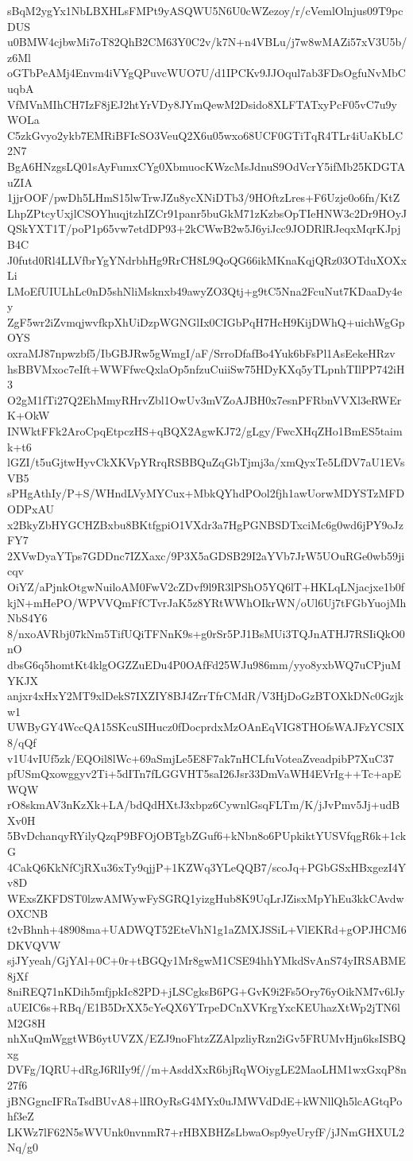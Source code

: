 sBqM2ygYx1NbLBXHLsFMPt9yASQWU5N6U0cWZezoy/r/cVemlOlnjus09T9pcDUS
u0BMW4cjbwMi7oT82QhB2CM63Y0C2v/k7N+n4VBLu/j7w8wMAZi57xV3U5b/z6Ml
oGTbPeAMj4Envm4iVYgQPuvcWUO7U/d1IPCKv9JJOqul7ab3FDsOgfuNvMbCuqbA
VfMVnMIhCH7IzF8jEJ2htYrVDy8JYmQewM2Dsido8XLFTATxyPcF05vC7u9yWOLa
C5zkGvyo2ykb7EMRiBFIcSO3VeuQ2X6u05wxo68UCF0GTiTqR4TLr4iUaKbLC2N7
BgA6HNzgsLQ01sAyFumxCYg0XbmuocKWzcMsJdnuS9OdVcrY5ifMb25KDGTAuZIA
1jjrOOF/pwDh5LHmS15lwTrwJZu8ycXNiDTb3/9HOftzLres+F6Uzje0o6fn/KtZ
LhpZPtcyUxjlCSOYhuqjtzhIZCr91panr5buGkM71zKzbsOpTIeHNW3c2Dr9HOyJ
QSkYXT1T/poP1p65vw7etdDP93+2kCWwB2w5J6yiJcc9JODRlRJeqxMqrKJpjB4C
J0futd0Rl4LLVfbrYgYNdrbhHg9RrCH8L9QoQG66ikMKnaKqjQRz03OTduXOXxLi
LMoEfUIULhLc0nD5shNliMsknxb49awyZO3Qtj+g9tC5Nna2FcuNut7KDaaDy4ey
ZgF5wr2iZvmqjwvfkpXhUiDzpWGNGlIx0CIGbPqH7HcH9KijDWhQ+uichWgGpOYS
oxraMJ87npwzbf5/IbGBJRw5gWmgI/aF/SrroDfafBo4Yuk6bFsPl1AsEekeHRzv
hsBBVMxoc7eIft+WWFfwcQxlaOp5nfzuCuiiSw75HDyKXq5yTLpnhTIlPP742iH3
O2gM1fTi27Q2EhMmyRHrvZbl1OwUv3mVZoAJBH0x7esnPFRbnVVXl3eRWErK+OkW
INWktFFk2AroCpqEtpczHS+qBQX2AgwKJ72/gLgy/FwcXHqZHo1BmES5taimk+t6
lGZI/t5uGjtwHyvCkXKVpYRrqRSBBQuZqGbTjmj3a/xmQyxTe5LfDV7aU1EVsVB5
sPHgAthIy/P+S/WHndLVyMYCux+MbkQYhdPOol2fjh1awUorwMDYSTzMFDODPxAU
x2BkyZbHYGCHZBxbu8BKtfgpiO1VXdr3a7HgPGNBSDTxciMc6g0wd6jPY9oJzFY7
2XVwDyaYTps7GDDnc7IZXaxc/9P3X5aGDSB29I2aYVb7JrW5UOuRGe0wb59jicqv
OiYZ/aPjnkOtgwNuiloAM0FwV2cZDvf9l9R3lPShO5YQ6lT+HKLqLNjacjxe1b0f
kjN+mHePO/WPVVQmFfCTvrJaK5z8YRtWWhOIkrWN/oUl6Uj7tFGbYuojMhNbS4Y6
8/nxoAVRbj07kNm5TifUQiTFNnK9s+g0rSr5PJ1BsMUi3TQJnATHJ7RSIiQkO0nO
dbsG6q5homtKt4klgOGZZuEDu4P0OAfFd25WJu986mm/yyo8yxbWQ7uCPjuMYKJX
anjxr4xHxY2MT9xlDekS7IXZIY8BJ4ZrrTfrCMdR/V3HjDoGzBTOXkDNc0Gzjkw1
UWByGY4WccQA15SKcuSIHucz0fDocprdxMzOAnEqVIG8THOfsWAJFzYCSIX8/qQf
v1U4vIUf5zk/EQOil8lWc+69aSmjLe5E8F7ak7nHCLfuVoteaZveadpibP7XuC37
pfUSmQxowggyv2Ti+5dITn7fLGGVHT5saI26Jsr33DmVaWH4EVrIg++Tc+apEWQW
rO8skmAV3nKzXk+LA/bdQdHXtJ3xbpz6CywnlGsqFLTm/K/jJvPmv5Jj+udBXv0H
5BvDchanqyRYilyQzqP9BFOjOBTgbZGuf6+kNbn8o6PUpkiktYUSVfqgR6k+1ckG
4CakQ6KkNfCjRXu36xTy9qjjP+1KZWq3YLeQQB7/scoJq+PGbGSxHBxgezI4Yv8D
WExsZKFDST0lzwAMWywFySGRQ1yizgHub8K9UqLrJZisxMpYhEu3kkCAvdwOXCNB
t2vBhnh+48908ma+UADWQT52EteVhN1g1aZMXJSSiL+VlEKRd+gOPJHCM6DKVQVW
sjJYyeah/GjYAl+0C+0r+tBGQy1Mr8gwM1CSE94hhYMkdSvAnS74yIRSABME8jXf
8niREQ71nKDih5mfjpkIc82PD+jLSCgksB6PG+GvK9i2Fs5Ory76yOikNM7v6lJy
aUEIC6s+RBq/E1B5DrXX5cYeQX6YTrpeDCnXVKrgYxcKEUhazXtWp2jTN6lM2G8H
nhXuQmWggtWB6ytUVZX/EZJ9noFhtzZZAlpzliyRzn2iGv5FRUMvHjn6ksISBQxg
DVFg/IQRU+dRgJ6RlIy9f//m+AsddXxR6bjRqWOiygLE2MaoLHM1wxGxqP8n27f6
jBNGgncIFRaTsdBUvA8+lIROyRsG4MYx0uJMWVdDdE+kWNllQh5lcAGtqPohf3eZ
LKWz7lF62N5sWVUnk0nvnmR7+rHBXBHZsLbwaOsp9yeUryfF/jJNmGHXUL2Nq/g0
